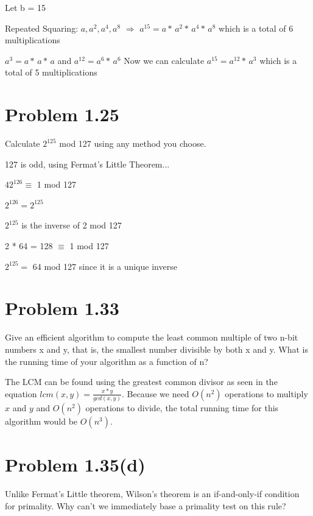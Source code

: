 \documentclass{article}
\begin{document}
\begin{center}
Let b = 15

Repeated Squaring: $a, a^{2}, a^{4}, a^{8}$ $\Rightarrow$ $a^{15} = a *\, a^{2} *\, a^{4}*\, a^{8}$ which is a total of 6 multiplications
\vspace{2mm}

$a^{3} = a *\, a *\, a$ and $a^{12} = a^{6} *\, a^{6}$
Now we can calculate $a^{15} = a^{12} *\, a^{3}$ which is a total of 5 multiplications
\end{center}

\section{Problem 1.25}
Calculate $2^{125}$ mod 127 using any method you choose.

\begin{center}
127 is odd, using Fermat's Little Theorem...

$42^{126} \equiv$ 1 mod 127 

$2^{126} = 2^{125}$

$2^{125}$ is the inverse of 2 mod 127

2 * 64 = 128 $\equiv$ 1 mod 127

$2^{125} =$ 64 mod 127 since it is a unique inverse
\end{center}

\section{Problem 1.33}
Give an efficient algorithm to compute the least common multiple of two n-bit numbers x and
y, that is, the smallest number divisible by both x and y. What is the running time of your
algorithm as a function of n?
\vspace{2mm}

The LCM can be found using the greatest common divisor as seen in the equation $lcm(x,y) = \frac{x*y}{gcd(x,y)}$. Because we need $O(n^{2})$ operations to multiply $x$ and $y$ and $O(n^{2})$ operations to divide, the total running time for this algorithm would be $O(n^{3})$.

\section{Problem 1.35(d)}
Unlike Fermat’s Little theorem, Wilson’s theorem is an if-and-only-if condition for primality.
Why can’t we immediately base a primality test on this rule?
\vspace{2mm}
\end{document}
